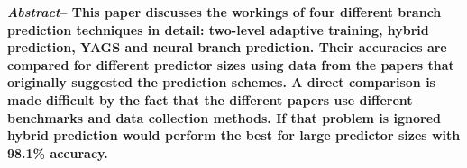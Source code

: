 \textbf{\textit{Abstract}-- This paper discusses the workings of four different branch prediction techniques in detail: two-level adaptive training, hybrid prediction, YAGS and neural branch prediction. Their accuracies are compared for different predictor sizes using data from the papers that originally suggested the prediction schemes. A direct comparison is made difficult by the fact that the different papers use different benchmarks and data collection methods. If that problem is ignored hybrid prediction would perform the best for large predictor sizes with 98.1\% accuracy.}